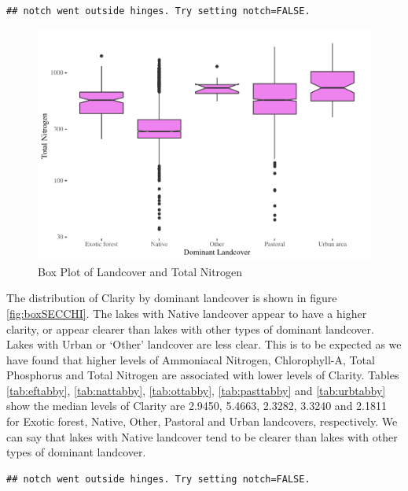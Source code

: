 \documentclass[
]{article}
\begin{document}
\begin{verbatim}
## notch went outside hinges. Try setting notch=FALSE.
\end{verbatim}

\begin{figure}
\centering
\includegraphics{Final-Report_files/figure-latex/boxTN-1.pdf}
\caption{\label{fig:boxTN}Box Plot of Landcover and Total Nitrogen}
\end{figure}

The distribution of Clarity by dominant landcover is shown in figure \ref{fig:boxSECCHI}. The lakes with Native landcover appear to have a higher clarity, or appear clearer than lakes with other types of dominant landcover. Lakes with Urban or `Other' landcover are less clear. This is to be expected as we have found that higher levels of Ammoniacal Nitrogen, Chlorophyll-A, Total Phosphorus and Total Nitrogen are associated with lower levels of Clarity. Tables \ref{tab:eftabby}, \ref{tab:nattabby}, \ref{tab:ottabby}, \ref{tab:pasttabby} and \ref{tab:urbtabby} show the median levels of Clarity are 2.9450, 5.4663, 2.3282, 3.3240 and 2.1811 for Exotic forest, Native, Other, Pastoral and Urban landcovers, respectively. We can say that lakes with Native landcover tend to be clearer than lakes with other types of dominant landcover.

\begin{verbatim}
## notch went outside hinges. Try setting notch=FALSE.
\end{verbatim}
\end{document}
